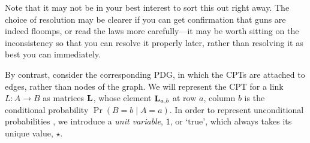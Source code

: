 \documentclass{article}
\newcommand{\MN}{PDG}
\begin{document}
\begin{example}
			
			
		Note that it may not be in your best interest to sort this out right away. The choice of resolution may be clearer if you can get confirmation that guns are indeed floomps, or read the laws more carefully---it may be worth sitting on the inconsistency so that you can resolve it properly later, rather than resolving it as best you can immediately.

%			
%			
%			
%
		
		By contrast, consider the corresponding \MN,
		in which the CPTs are attached to edges, rather than nodes of the graph. 
		We will represent the CPT for a link $L \!\colon\! A\!\to\! B$ as matrices $\mathbf L$, whose element $\mathbf L_{a,b}$ at row $a$, column $b$ is the conditional probability $\Pr(B \!\!=\!\!b \mid A \!\!=\!\! a)$. 		
		In order to represent unconditional probabilities%
		, we introduce a \emph{unit variable}, $\mathsf 1$, or `$\mathrm{true}$', which always takes its unique value, $\star$. 
		
		\begin{figure}[h]
			\centering
\end{figure}
\end{example}
\end{document}
